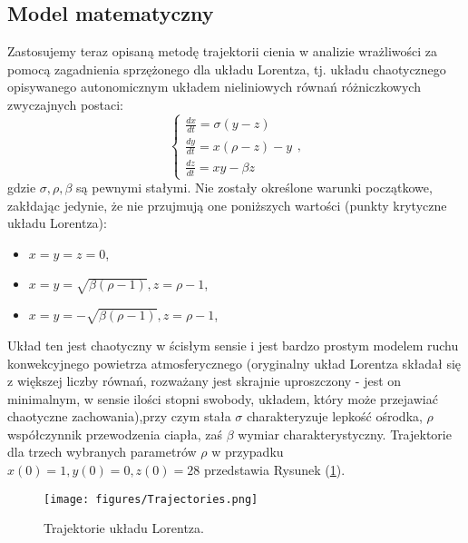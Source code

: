 \documentclass[12pt, twoside]{book}
\begin{document}
\subsection{Model matematyczny}
Zastosujemy teraz opisaną metodę trajektorii cienia w analizie wrażliwości za pomocą zagadnienia sprzężonego dla układu Lorentza, tj. układu chaotycznego opisywanego autonomicznym układem nieliniowych równań różniczkowych zwyczajnych postaci:
\begin{equation}
\begin{cases} 
\frac{dx}{dt} = \sigma(y-z) \\ 
\frac{dy}{dt} = x(\rho-z)-y \\ 
\frac{dz}{dt} = xy-\beta z 
\end{cases},
\label{lorenz_eq}
\end{equation}
gdzie $ \sigma, \rho, \beta $ są pewnymi stałymi. Nie zostały określone warunki początkowe, zakłdając jedynie, że nie przujmują one poniższych wartości (punkty krytyczne układu Lorentza):
\begin{itemize}
	\item $ x = y = z = 0 $,
	\item $ x = y = \sqrt{\beta(\rho - 1)}, z = \rho - 1 $,
	\item $ x = y = -\sqrt{\beta(\rho - 1)}, z = \rho - 1 $,
\end{itemize}
Układ ten jest chaotyczny w ścisłym sensie i jest bardzo prostym modelem ruchu konwekcyjnego powietrza atmosferycznego (oryginalny układ Lorentza składał się z większej liczby równań, rozważany jest skrajnie uproszczony - jest on minimalnym, w sensie ilości stopni swobody, układem, który może przejawiać chaotyczne zachowania),przy czym stała   $ \sigma $ charakteryzuje lepkość ośrodka, $ \rho $ współczynnik przewodzenia ciapła, zaś $ \beta $ wymiar charakterystyczny.\newline
Trajektorie dla trzech wybranych parametrów $ \rho $ w przypadku $ x(0) = 1, y(0) = 0, z(0) = 28 $ przedstawia Rysunek (\ref{Fig15}).
\begin{figure}[H]
	\texttt{[image: figures/Trajectories.png]} 
	\centering
	\caption{Trajektorie układu Lorentza.}
	\label{Fig15}
\end{figure}
\end{document}
